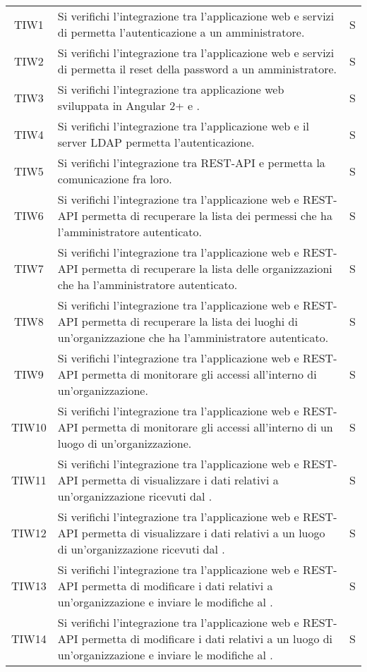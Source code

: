 {\begin{longtable}{ c C{13cm} C{1cm}}
TIW1 & Si verifichi l’integrazione tra l’applicazione web e servizi di  permetta l’autenticazione a un amministratore. & S \\
TIW2 & Si verifichi l’integrazione tra l’applicazione web e servizi di  permetta il reset della password a un amministratore. & S \\
TIW3 & Si verifichi l’integrazione tra applicazione web sviluppata in Angular 2+ e .& S \\
TIW4 & Si verifichi l’integrazione tra l’applicazione web e il server LDAP permetta l’autenticazione.& S \\
TIW5 & Si verifichi l’integrazione tra REST-API e  permetta la comunicazione fra loro.& S \\
TIW6 & Si verifichi l’integrazione tra l’applicazione web e REST-API permetta di recuperare la lista dei permessi che ha l’amministratore autenticato.& S \\
TIW7 & Si verifichi l’integrazione tra l’applicazione web e REST-API permetta di recuperare la lista delle organizzazioni che ha l’amministratore autenticato.& S \\
TIW8 & Si verifichi l’integrazione tra l’applicazione web e REST-API permetta di recuperare la lista dei luoghi di un’organizzazione che ha l’amministratore autenticato.& S \\
TIW9 & Si verifichi l’integrazione tra l’applicazione web e REST-API permetta di monitorare gli accessi all’interno di un’organizzazione.& S \\
TIW10 & Si verifichi l’integrazione tra l’applicazione web e REST-API permetta di monitorare gli accessi all’interno di un luogo di un’organizzazione.& S \\
TIW11 & Si verifichi l’integrazione tra l’applicazione web e REST-API permetta di visualizzare i dati relativi a un’organizzazione ricevuti dal .& S \\
TIW12 & Si verifichi l’integrazione tra l’applicazione web e REST-API permetta di visualizzare i dati relativi a un luogo di un’organizzazione ricevuti dal .& S \\
TIW13 & Si verifichi l’integrazione tra l’applicazione web e REST-API permetta di modificare i dati relativi a un’organizzazione e inviare le modifiche al .& S \\
TIW14 & Si verifichi l’integrazione tra l’applicazione web e REST-API permetta di modificare i dati relativi a un luogo di un’organizzazione e inviare le modifiche al .& S \\

\end{longtable}}
